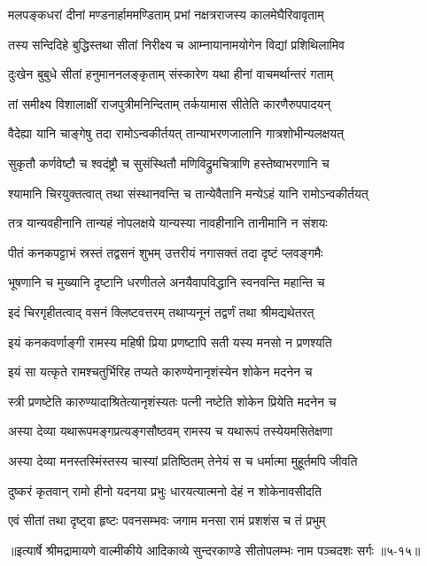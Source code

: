 \twolineshloka
{मलपङ्कधरां दीनां मण्डनार्हाममण्डिताम्}
{प्रभां नक्षत्रराजस्य कालमेघैरिवावृताम्} %

\twolineshloka
{तस्य सन्दिदिहे बुद्धिस्तथा सीतां निरीक्ष्य च}
{आम्नायानामयोगेन विद्यां प्रशिथिलामिव} %

\twolineshloka
{दुःखेन बुबुधे सीतां हनुमाननलङ्कृताम्}
{संस्कारेण यथा हीनां वाचमर्थान्तरं गताम्} %

\twolineshloka
{तां समीक्ष्य विशालाक्षीं राजपुत्रीमनिन्दिताम्}
{तर्कयामास सीतेति कारणैरुपपादयन्} %

\twolineshloka
{वैदेह्या यानि चाङ्गेषु तदा रामोऽन्वकीर्तयत्}
{तान्याभरणजालानि गात्रशोभीन्यलक्षयत्} %

\twolineshloka
{सुकृतौ कर्णवेष्टौ च श्वदंष्ट्रौ च सुसंस्थितौ}
{मणिविद्रुमचित्राणि हस्तेष्वाभरणानि च} %

\twolineshloka
{श्यामानि चिरयुक्तत्वात् तथा संस्थानवन्ति च}
{तान्येवैतानि मन्येऽहं यानि रामोऽन्वकीर्तयत्} %

\twolineshloka
{तत्र यान्यवहीनानि तान्यहं नोपलक्षये}
{यान्यस्या नावहीनानि तानीमानि न संशयः} %

\twolineshloka
{पीतं कनकपट्टाभं स्रस्तं तद्वसनं शुभम्}
{उत्तरीयं नगासक्तं तदा दृष्टं प्लवङ्गमैः} %

\twolineshloka
{भूषणानि च मुख्यानि दृष्टानि धरणीतले}
{अनयैवापविद्धानि स्वनवन्ति महान्ति च} %

\twolineshloka
{इदं चिरगृहीतत्वाद् वसनं क्लिष्टवत्तरम्}
{तथाप्यनूनं तद्वर्णं तथा श्रीमद्यथेतरत्} %

\twolineshloka
{इयं कनकवर्णाङ्गी रामस्य महिषी प्रिया}
{प्रणष्टापि सती यस्य मनसो न प्रणश्यति} %

\twolineshloka
{इयं सा यत्कृते रामश्चतुर्भिरिह तप्यते}
{कारुण्येनानृशंस्येन शोकेन मदनेन च} %

\twolineshloka
{स्त्री प्रणष्टेति कारुण्यादाश्रितेत्यानृशंस्यतः}
{पत्नी नष्टेति शोकेन प्रियेति मदनेन च} %

\twolineshloka
{अस्या देव्या यथारूपमङ्गप्रत्यङ्गसौष्ठवम्}
{रामस्य च यथारूपं तस्येयमसितेक्षणा} %

\twolineshloka
{अस्या देव्या मनस्तस्मिंस्तस्य चास्यां प्रतिष्ठितम्}
{तेनेयं स च धर्मात्मा मुहूर्तमपि जीवति} %

\twolineshloka
{दुष्करं कृतवान् रामो हीनो यदनया प्रभुः}
{धारयत्यात्मनो देहं न शोकेनावसीदति} %

\twolineshloka
{एवं सीतां तथा दृष्ट्वा हृष्टः पवनसम्भवः}
{जगाम मनसा रामं प्रशशंस च तं प्रभुम्} %


॥इत्यार्षे श्रीमद्रामायणे वाल्मीकीये आदिकाव्ये सुन्दरकाण्डे सीतोपलम्भः नाम पञ्चदशः सर्गः ॥५-१५॥

